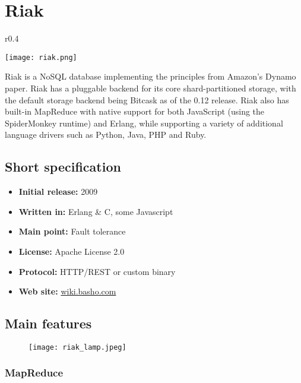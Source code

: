 \chapter{Riak}

\begin{wrapfigure}{r}{0.4\textwidth}
  \vspace{-40pt}
  \begin{center}
    \texttt{[image: riak.png]}
  \end{center}
  \vspace{-20pt}
\end{wrapfigure}
Riak is a NoSQL database implementing the principles from Amazon's Dynamo paper.
Riak has a pluggable backend for its core shard-partitioned storage, with the default storage backend being Bitcask as of the 0.12 release. Riak also has built-in MapReduce with native support for both JavaScript (using the SpiderMonkey runtime) and Erlang, while supporting a variety of additional language drivers such as Python, Java, PHP and Ruby.

\section{Short specification}

\begin{itemize}
  \item \textbf{Initial release:} 2009
  \item \textbf{Written in:} Erlang \& C, some Javascript
  \item \textbf{Main point:} Fault tolerance
  \item \textbf{License:} Apache License 2.0
  \item \textbf{Protocol:} HTTP/REST or custom binary
  \item \textbf{Web site:} \href{http://wiki.basho.com/}{wiki.basho.com}
\end{itemize}

\section{Main features}

\begin{figure}[hb]
  \centering
  \texttt{[image: riak\_lamp.jpeg]}
\end{figure}

\subsection{MapReduce}

